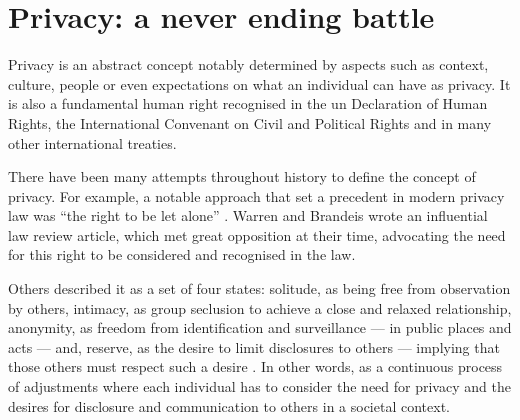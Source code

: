 


\section{Privacy: a never ending battle}
    \label{section:thesis:privacy-a-never-ending-battle}

Privacy is an abstract concept notably determined by aspects such as context, culture, 
people or even expectations on what an individual can have as privacy. It is also 
a fundamental human right recognised in the \ac{un} Declaration of Human Rights, 
the International Convenant on Civil and Political Rights and in many other international 
treaties.

There have been many attempts throughout history to define the concept of privacy. 
For example, a notable approach that set a precedent in modern privacy law was ``the 
right to be let alone'' \cite{WarrenB90}. Warren and Brandeis wrote an influential 
law review article, which met great opposition at their time, advocating the need 
for this right to be considered and recognised in the  law. 

Others described it as a set of four states: solitude, as being free from observation 
by others, intimacy, as group seclusion to achieve a close and relaxed relationship, 
anonymity, as freedom from identification and surveillance --- in public places 
and acts --- and, reserve, as the desire to limit disclosures to others --- implying 
that those others must respect such a desire \cite{Westin70}. In other words, as a 
continuous process of adjustments where each individual has to consider the need 
for privacy and the desires for disclosure and communication to others in a societal 
context.

